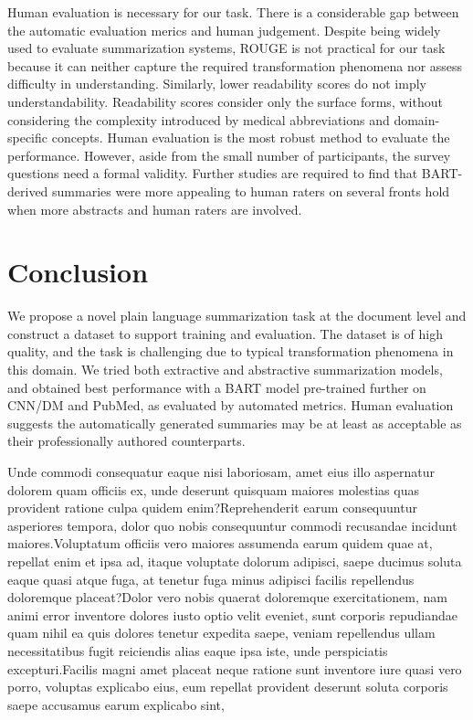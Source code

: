\documentclass[letterpaper, table]{article} %
\begin{document}
Human evaluation is necessary for our task.
There is a considerable gap between the automatic evaluation merics
and human judgement.
Despite being widely used to evaluate summarization systems, ROUGE is not practical for our task because it can neither capture the required transformation phenomena nor assess difficulty in understanding.
Similarly, lower readability scores do not imply understandability.
Readability scores consider only the surface forms,
without considering the complexity introduced by medical abbreviations and domain-specific concepts.
Human evaluation is the most robust method to evaluate the performance.
However, aside from the small number of participants,
the survey questions need a formal validity.
Further studies are required to find that BART-derived summaries were more appealing to human raters on several fronts hold when more abstracts and human raters are involved.






\vspace{-4.07mm}
\section{Conclusion}
We propose a novel plain language summarization task at the document level and construct a dataset to support training and evaluation. The dataset is of high quality, and the task is challenging due to typical transformation phenomena in this domain. We tried both extractive and abstractive summarization models, and obtained best performance with a BART model pre-trained further on CNN/DM and PubMed, as evaluated by automated metrics. Human evaluation suggests the automatically generated summaries may be at least as acceptable as their professionally authored counterparts.




  Unde commodi consequatur eaque nisi laboriosam, amet eius illo aspernatur dolorem quam officiis ex, unde deserunt quisquam maiores molestias quas provident ratione culpa quidem enim?Reprehenderit earum consequuntur asperiores tempora, dolor quo nobis consequuntur commodi recusandae incidunt maiores.Voluptatum officiis vero maiores assumenda earum quidem quae at, repellat enim et ipsa ad, itaque voluptate dolorum adipisci, saepe ducimus soluta eaque quasi atque fuga, at tenetur fuga minus adipisci facilis repellendus doloremque placeat?Dolor vero nobis quaerat doloremque exercitationem, nam animi error inventore dolores iusto optio velit eveniet, sunt corporis repudiandae quam nihil ea quis dolores tenetur expedita saepe, veniam repellendus ullam necessitatibus fugit reiciendis alias eaque ipsa iste, unde perspiciatis excepturi.Facilis magni amet placeat neque ratione sunt inventore iure quasi vero porro, voluptas explicabo eius, eum repellat provident deserunt soluta corporis saepe accusamus earum explicabo sint,

\end{document}
